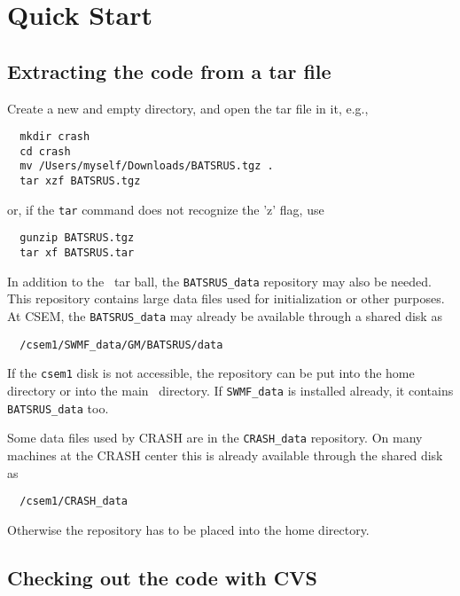 \section{Quick Start \label{section:quick_start}}

\subsection{Extracting the code from a tar file}

Create a new and empty directory, and open the tar file in it, e.g., 
\begin{verbatim}
  mkdir crash
  cd crash
  mv /Users/myself/Downloads/BATSRUS.tgz .
  tar xzf BATSRUS.tgz
\end{verbatim}
or, if the {\tt tar} command does not recognize the 'z' flag, use
\begin{verbatim}
  gunzip BATSRUS.tgz
  tar xf BATSRUS.tar
\end{verbatim}
In addition to the \BATSRUS\ tar ball, the {\tt BATSRUS\_data} repository may also be 
needed. This repository contains large data files used for initialization or
other purposes. At CSEM, the {\tt BATSRUS\_data} may already be available through 
a shared disk as
\begin{verbatim}
  /csem1/SWMF_data/GM/BATSRUS/data
\end{verbatim}
If the {\tt csem1} disk is not accessible, the repository 
can be put into the home directory or into the main \BATSRUS\ directory.
If {\tt SWMF\_data} is installed already, it contains {\tt BATSRUS\_data} too.

Some data files used by CRASH are in the {\tt CRASH\_data} repository. 
On many machines at the CRASH center this is already available through 
the shared disk as
\begin{verbatim}
  /csem1/CRASH_data
\end{verbatim}
Otherwise the repository has to be placed into the home directory.

\subsection{Checking out the code with CVS}

